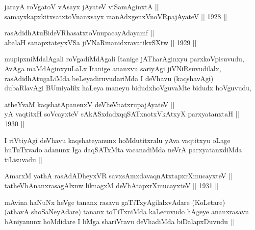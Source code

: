 
\begin{shl}
jarayA roVgatoV vA\s sayx jAyateV viSamAginxtA || \\
samayxkapxkitxsatxtoV\s nanxsayx manAdxgenxVnoVRpajAyateV ||  1928 || 
\end{shl}
				
\begin{shl}
rasAdidhAtuBideVRhasatxtoV\s nupacayAdayamf || \\
abalaH sanapxtateyxVSa jiVNaRmanidxravatikxSXtw ||  1929 ||  
\end{shl}

\begin{artha}
mupipxniMdalAgali roVgadiMdAgali Itanige jATharAginxyu
parxkoVpisuvudu, AvAga maMdAginxyuLaLx Itanige ananxvu sariyAgi
jiVNiRsuvudilalx, rasAdidhAtugaLiMda beLeyadiruvudariMda I deVhavu
(kaqshavAgi) dubaRlavAgi BUmiyalilx haLeya maneyu bidudxhoVguvaMte
bidudx hoVguvudu,
\end{artha}


\begin{shl}
atheYvaM kaqshatApanenxV deVheVnatxrupajAyateV ||  \\
yA vaqtitxH soVcayxteV sAkASxdadxqqSATxnotxVkAtxyX parxyatanxtaH ||  1930 ||  
\end{shl}

\begin{artha}
I riVtiyAgi deVhavu kaqshateyanunx hoMdutitxralu yAva vaqtitxyu oLage
huTuTxvado adanunx Iga daqSATxMta vacanadiMda neVrA parxyatanxdiMda
tiLisuvadu ||
\end{artha}

\begin{shl}
AmarxM yathA rasAdADheyxVR savxsAmxdavaqnAtxtapxrXmucayxteV || \\
tatheVhAnanxrasagAlxnw liknagxM deVhAtapxrXmucayxteV ||  1931 ||  
\end{shl}

\begin{artha}
mAvina haNuNx heVge tananx rasavu gaTiTxyAgilalxvAdare (KoLetare)
(athavA shoSaNeyAdare) tananx toTiTxniMda kaLecuvudo hAgeye
ananxrasavu hAniyanunx hoMdidare I liMga shariVravu deVhadiMda
biDalapxDuvudu ||
\end{artha}


